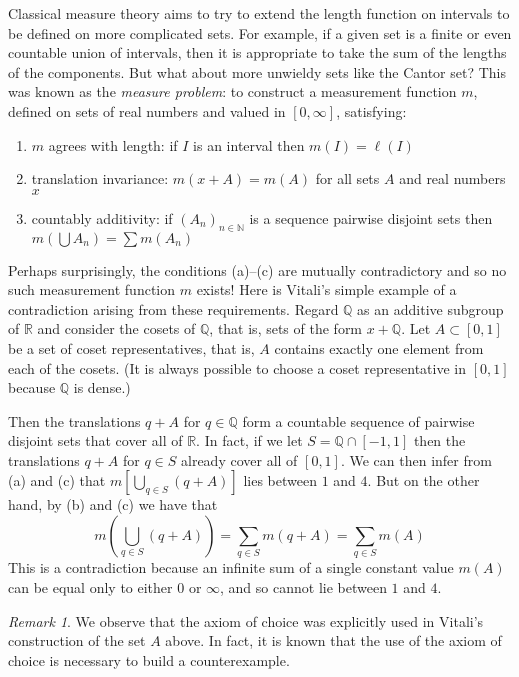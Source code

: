 \documentclass[11pt,oneside]{amsbook}
\newcommand{\NN}{\mathbb N}
\newcommand{\QQ}{\mathbb Q}
\newcommand{\RR}{\mathbb R}
\theoremstyle{definition}
\theoremstyle{plain}
\theoremstyle{definition}
\theoremstyle{remark}
\newtheorem{rem}[thm]{Remark}
\numberwithin{equation}{section}
\numberwithin{figure}{section}
\begin{document}
Classical measure theory aims to try to extend the length function on intervals to be defined on more complicated sets. For example, if a given set is a finite or even countable union of intervals, then it is appropriate to take the sum of the lengths of the components. But what about more unwieldy sets like the Cantor set? This was known as the \emph{measure problem}: to construct a measurement function $m$, defined on sets of real numbers and valued in $[0,\infty]$, satisfying:
\begin{enumerate}
\item $m$ agrees with length: if $I$ is an interval then $m(I)=\ell(I)$
\item translation invariance: $m(x+A)=m(A)$ for all sets $A$ and real numbers $x$
\item countably additivity: if $(A_n)_{n\in\NN}$ is a sequence pairwise disjoint sets then $m(\bigcup A_n)=\sum m(A_n)$
\end{enumerate}

Perhaps surprisingly, the conditions (a)--(c) are mutually contradictory and so no such measurement function $m$ exists! Here is Vitali's simple example of a contradiction arising from these requirements. Regard $\QQ$ as an additive subgroup of $\RR$ and consider the cosets of $\QQ$, that is, sets of the form $x+\QQ$. Let $A\subset[0,1]$ be a set of coset representatives, that is, $A$ contains exactly one element from each of the cosets. (It is always possible to choose a coset representative in $[0,1]$ because $\QQ$ is dense.)

Then the translations $q+A$ for $q\in\QQ$ form a countable sequence of pairwise disjoint sets that cover all of $\RR$. In fact, if we let $S=\QQ\cap[-1,1]$ then the translations $q+A$ for $q\in S$ already cover all of $[0,1]$. We can then infer from (a) and (c) that $m[\bigcup_{q\in S}(q+A)]$ lies between $1$ and $4$. But on the other hand, by (b) and (c) we have that 
\[m\left(\bigcup_{q\in S}(q+A)\right)=\sum_{q\in S}m(q+A)=\sum_{q\in S}m(A)
\]
This is a contradiction because an infinite sum of a single constant value $m(A)$ can be equal only to either $0$ or $\infty$, and so cannot lie between $1$ and $4$.

\begin{rem}
  We observe that the axiom of choice was explicitly used in Vitali's construction of the set $A$ above. In fact, it is known that the use of the axiom of choice is necessary to build a counterexample.
\end{rem}
\end{document}
